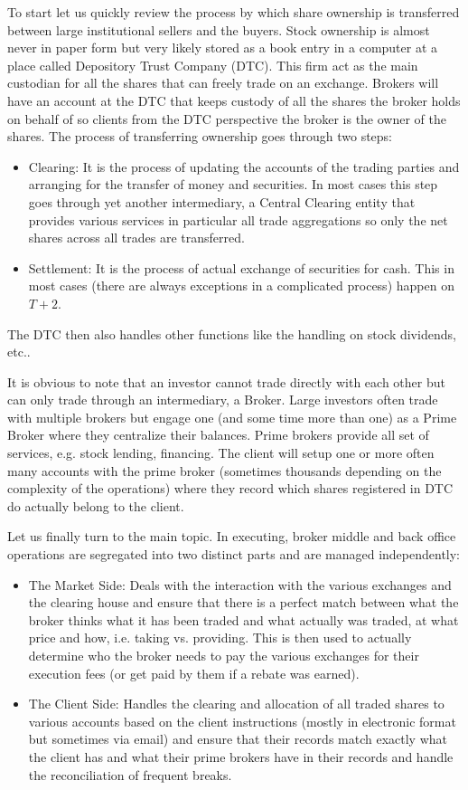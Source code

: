 To start let us quickly review the process by which share ownership is transferred between large institutional sellers and the buyers. Stock ownership is almost never in paper form but very likely stored as a book entry in a computer at a place called Depository Trust Company (DTC). This firm act as the main custodian for all the shares that can freely trade on an exchange. Brokers will have an account at the DTC that keeps custody of all the shares the broker holds on behalf of so clients from the DTC perspective the broker is the owner of the shares. The process of transferring ownership goes through two steps:
        \begin{itemize}
        \item Clearing: It is the process of updating the accounts of the trading parties and arranging for the transfer of money and securities. In most cases this step goes through yet another intermediary, a Central Clearing entity that provides various services in particular all trade aggregations so only the net shares across all trades are  transferred.
        \item Settlement: It is the process of actual exchange of securities for cash. This in most cases (there are always exceptions in a complicated process) happen on $T+2$.
        \end{itemize}
The DTC then also handles other functions like the handling on stock dividends, etc..


It is obvious to note that an investor cannot trade directly with each other but can only trade through an intermediary, a Broker. Large investors often trade with multiple brokers but engage one (and some time more than one) as a Prime Broker where they centralize their balances. Prime brokers provide all set of services, e.g. stock lending, financing. The client will setup one or more often many accounts with the prime broker (sometimes thousands depending on the complexity of the operations) where they record which shares registered in DTC do actually belong to the client.


Let us finally turn to the main topic. In executing, broker middle and back office operations are segregated into two distinct parts and are managed independently: 
        \begin{itemize}
        \item The Market Side: Deals with the interaction with the various exchanges  and the clearing house and ensure that there is a perfect match between what the broker thinks what it has been traded and what actually was traded, at what price and how, i.e. taking vs. providing. This is then used to actually determine who the broker needs to pay the various exchanges for their execution fees (or get paid by them if a rebate was earned).
        \item The Client Side: Handles the clearing and allocation of all traded shares to various accounts based on the client instructions (mostly in electronic format but sometimes via email) and ensure that their records match exactly what the client has and what their prime brokers have in their records and handle the reconciliation of frequent breaks.
        \end{itemize}


